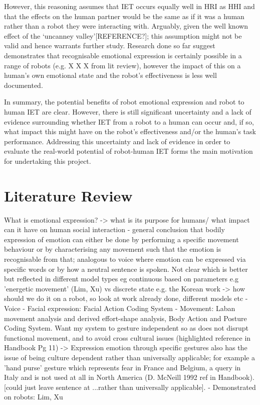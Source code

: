 \documentclass[11pt]{article}
\begin{document}
However, this reasoning assumes that IET occurs equally well in HRI as HHI and that the effects on the human partner would be the same as if it was a human rather than a robot they were interacting with. Arguably, given the well known effect of the `uncanney valley'[REFERENCE?]; this assumption might not be valid and hence warrants further study. Research done so far suggest demonstrates that recognisable emotional expression is certainly possible in a range of robots (e.g. X X X from lit review), however the impact of this on a human's own emotional state and the robot's effectiveness is less well documented. 

In summary, the potential benefits of robot emotional expression and robot to human IET are clear. However, there is still significant uncertainty and a lack of evidence surrounding whether IET from a robot to a human can occur  and, if so, what impact this might have on the robot's effectiveness and/or the human's task performance. Addressing this uncertainty and lack of evidence in order to evaluate the real-world potential of robot-human IET forms the main motivation for undertaking this project. 

\section{Literature Review}

What is emotional expression?
-> what is its purpose for humans/ what impact can it have on human social interaction
- general conclusion that bodily expression of emotion can either be done by performing a specific movement behaviour or by characterising any movement such that the emotion is recognisable from that; analogous to voice where emotion can be expressed via specific words or by how a neutral sentence is spoken. Not clear which is better but reflected in different model types eg continuous based on parameters e.g 'energetic movement' (Lim, Xu) vs discrete state e.g. the Korean work 
-> how should we do it on a robot, so look at work already done, different models etc
- Voice
- Facial expression: Facial Action Coding System
- Movement: Laban movement analysis and derived effort-shape analysis, Body Action and Posture Coding System. Want my system to gesture independent so as does not disrupt functional movement, and to avoid cross cultural issues (highlighted reference in Handbook Pg 11)
-> Expression emotion through specific gestures also has the issue of being culture dependent rather than universally applicable; for example a 'hand purse' gesture which represents fear in France and Belgium, a query in Italy and is not used at all in North America (D. McNeill 1992 ref in Handbook). [could just leave sentence at ...rather than universally applicable].  
- Demonstrated on robots: Lim, Xu
\end{document}
